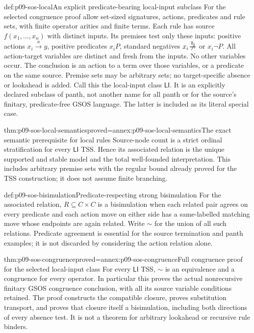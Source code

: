 \begin{hbdefinition}{def:p09-sos-local}{An explicit predicate-bearing local-input subclass}
For the selected congruence proof allow set-sized signatures, actions,
predicates and rule sets, with finite operator arities and finite terms.
Each rule has source \(f(x_1,\ldots,x_n)\) with distinct inputs.
Its premises test only these inputs: positive actions
\(x_i\xrightarrow a y\), positive predicates \(x_iP\),
standard negatives \(x_i\mathrel{\not\!\xrightarrow b}\)
or \(x_i\neg P\). All action-target variables are distinct and
fresh from the inputs. No other variables occur. The conclusion is
an action to a term over those variables, or a predicate on the same
source. Premise sets may be arbitrary sets; no target-specific absence
or lookahead is added. Call this the local-input class \(\mathsf{LI}\).
It is an explicitly declared subclass of panth, not another name for
all panth or for the source's finitary, predicate-free GSOS language.
The latter is included as its literal special case.
\end{hbdefinition}

\begin{hblemma}{thm:p09-sos-local-semantics}{proved=annex:p09-sos-local-semantics}{The exact semantic prerequisite for local rules}
Source-node count is a strict ordinal stratification for every
\(\mathsf{LI}\) TSS. Hence its associated relation is the unique
supported and stable model and the total well-founded interpretation.
This includes arbitrary premise sets with the regular bound already
proved for the TSS construction; it does not assume finite branching.
\end{hblemma}

\begin{hbdefinition}{def:p09-sos-bisimulation}{Predicate-respecting strong bisimulation}
For the associated relation, \(R\subseteq C\times C\) is a
bisimulation when each related pair agrees on every predicate and
each action move on either side has a same-labelled matching move
whose endpoints are again related. Write \(\sim\) for the union
of all such relations. Predicate agreement is essential for the source
termination and panth examples; it is not discarded by considering
the action relation alone.
\end{hbdefinition}

\begin{hbtheorem}{thm:p09-sos-congruence}{proved=annex:p09-sos-congruence}{Full congruence proof for the selected local-input class}
For every \(\mathsf{LI}\) TSS, \(\sim\) is an equivalence and
a congruence for every operator. In particular this proves the actual
nonrecursive finitary GSOS congruence conclusion, with all its source
variable conditions retained. The proof constructs the compatible
closure, proves substitution transport, and proves that closure itself
a bisimulation, including both directions of every absence test.
It is not a theorem for arbitrary lookahead or recursive rule binders.
\end{hbtheorem}

